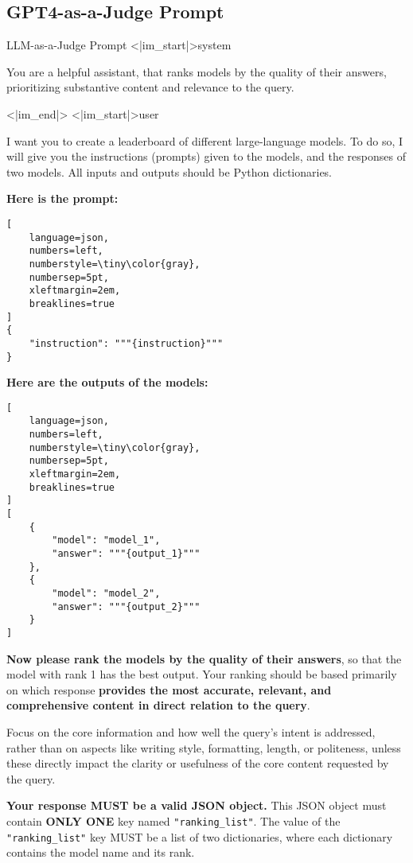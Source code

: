 \subsection{GPT4-as-a-Judge Prompt}
\vspace{-0.15in}
\begin{promptbox}{LLM-as-a-Judge Prompt}
\textless{}|im\_start|\textgreater{}system

You are a helpful assistant, that ranks models by the quality of their answers, prioritizing substantive content and relevance to the query.

\textless{}|im\_end|\textgreater{}
\textless{}|im\_start|\textgreater{}user

I want you to create a leaderboard of different large-language models. To do so, I will give you the instructions (prompts) given to the models, and the responses of two models. All inputs and outputs should be Python dictionaries.

\textbf{Here is the prompt:}
\begin{lstlisting}[
    language=json,
    numbers=left,
    numberstyle=\tiny\color{gray},
    numbersep=5pt,
    xleftmargin=2em,
    breaklines=true
]
{
    "instruction": """{instruction}"""
}
\end{lstlisting}

\textbf{Here are the outputs of the models:}
\begin{lstlisting}[
    language=json,
    numbers=left,
    numberstyle=\tiny\color{gray},
    numbersep=5pt,
    xleftmargin=2em,
    breaklines=true
]
[
    {
        "model": "model_1",
        "answer": """{output_1}"""
    },
    {
        "model": "model_2",
        "answer": """{output_2}"""
    }
]
\end{lstlisting}

\textbf{Now please rank the models by the quality of their answers}, so that the model with rank 1 has the best output. Your ranking should be based primarily on which response \textbf{provides the most accurate, relevant, and comprehensive content in direct relation to the query}.

Focus on the core information and how well the query's intent is addressed, rather than on aspects like writing style, formatting, length, or politeness, unless these directly impact the clarity or usefulness of the core content requested by the query.

\textbf{Your response MUST be a valid JSON object.}  
This JSON object must contain \textbf{ONLY ONE} key named \texttt{"ranking\_list"}.  
The value of the \texttt{"ranking\_list"} key MUST be a list of two dictionaries, where each dictionary contains the model name and its rank.


\end{promptbox}
